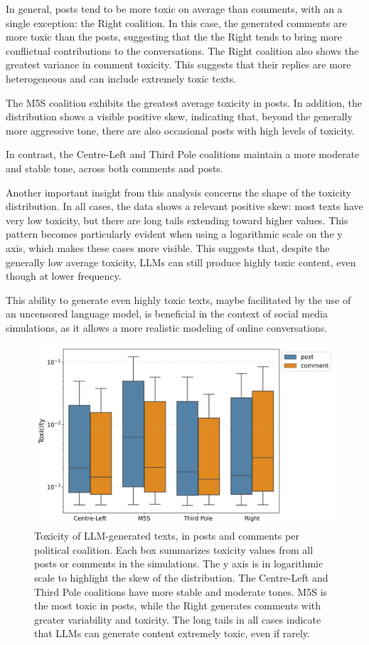 In general, posts tend to be more toxic on average than comments, with an a single exception: the Right coalition.
In this case, the generated comments are more toxic than the posts, suggesting that the the Right tends to bring more conflictual contributions to the conversations.
The Right coalition also shows the greatest variance in comment toxicity.
This suggests that their replies are more heterogeneous and can include extremely toxic texts.

The M5S coalition exhibits the greatest average toxicity in posts.
In addition, the distribution shows a visible positive skew, indicating that, beyond the generally more aggressive tone, there are also occasional posts with high levels of toxicity.

In contrast, the Centre-Left and Third Pole coalitions maintain a more moderate and stable tone, across both comments and posts.

Another important insight from this analysis concerns the shape of the toxicity distribution.
In all cases, the data shows a relevant positive skew: most texts have very low toxicity, but there are long tails extending toward higher values.
This pattern becomes particularly evident when using a logarithmic scale on the y axis, which makes these cases more visible.
This suggests that, despite the generally low average toxicity, LLMs can still produce highly toxic content, even though at lower frequency.

This ability to generate even highly toxic texts, maybe facilitated by the use of an uncensored language model, is beneficial in the context of social media simulations, as it allows a more realistic modeling of online conversations.


\begin{figure}[h]
    \centering
    \includegraphics[width=0.6\linewidth]{Images/Toxicity/box_posts_vs_comments.png}
    \caption{Toxicity of LLM-generated texts, in posts and comments per political coalition.
    Each box summarizes toxicity values from all posts or comments in the simulations.
    The y axis is in logarithmic scale to highlight the skew of the distribution.
    The Centre-Left and Third Pole coalitions have more stable and moderate tones.
    M5S is the most toxic in posts, while the Right generates comments with greater variability and toxicity.
    The long tails in all cases indicate that LLMs can generate content extremely toxic, even if rarely.}
    \label{fig:toxicity_box}
\end{figure}


